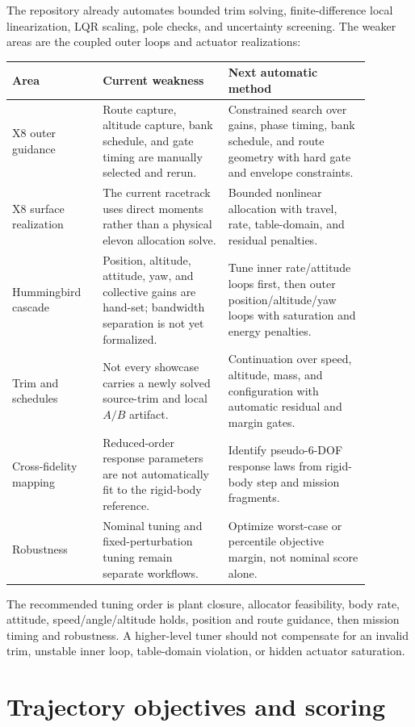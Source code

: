 \documentclass[11pt]{article}
\begin{document}
The repository already automates bounded trim solving, finite-difference local
linearization, LQR scaling, pole checks, and uncertainty screening. The weaker
areas are the coupled outer loops and actuator realizations:

\begin{longtable}{p{0.22\linewidth}p{0.31\linewidth}p{0.35\linewidth}}
\toprule
\textbf{Area} & \textbf{Current weakness} & \textbf{Next automatic method} \\
\midrule
\endhead
X8 outer guidance & Route capture, altitude capture, bank schedule, and gate timing are manually selected and rerun. & Constrained search over gains, phase timing, bank schedule, and route geometry with hard gate and envelope constraints. \\
X8 surface realization & The current racetrack uses direct moments rather than a physical elevon allocation solve. & Bounded nonlinear allocation with travel, rate, table-domain, and residual penalties. \\
Hummingbird cascade & Position, altitude, attitude, yaw, and collective gains are hand-set; bandwidth separation is not yet formalized. & Tune inner rate/attitude loops first, then outer position/altitude/yaw loops with saturation and energy penalties. \\
Trim and schedules & Not every showcase carries a newly solved source-trim and local $A/B$ artifact. & Continuation over speed, altitude, mass, and configuration with automatic residual and margin gates. \\
Cross-fidelity mapping & Reduced-order response parameters are not automatically fit to the rigid-body reference. & Identify pseudo-6-DOF response laws from rigid-body step and mission fragments. \\
Robustness & Nominal tuning and fixed-perturbation tuning remain separate workflows. & Optimize worst-case or percentile objective margin, not nominal score alone. \\
\bottomrule
\end{longtable}

The recommended tuning order is plant closure, allocator feasibility, body
rate, attitude, speed/angle/altitude holds, position and route guidance, then
mission timing and robustness. A higher-level tuner should not compensate for
an invalid trim, unstable inner loop, table-domain violation, or hidden
actuator saturation.

\section{Trajectory objectives and scoring}
\label{sec:scoring}
\end{document}

